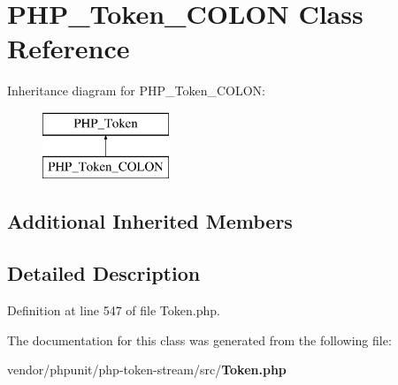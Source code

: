 \section{P\+H\+P\+\_\+\+Token\+\_\+\+C\+O\+L\+O\+N Class Reference}
\label{class_p_h_p___token___c_o_l_o_n}
Inheritance diagram for P\+H\+P\+\_\+\+Token\+\_\+\+C\+O\+L\+O\+N\+:\begin{figure}[H]
\begin{center}
\leavevmode
\includegraphics[height=2.000000cm]{class_p_h_p___token___c_o_l_o_n}
\end{center}
\end{figure}
\subsection*{Additional Inherited Members}


\subsection{Detailed Description}


Definition at line 547 of file Token.\+php.



The documentation for this class was generated from the following file\+:\begin{DoxyCompactItemize}
\item 
vendor/phpunit/php-\/token-\/stream/src/{\bf Token.\+php}\end{DoxyCompactItemize}

